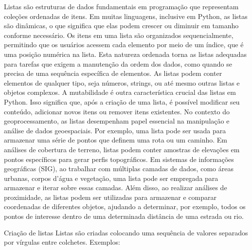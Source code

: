 \documentclass[letterpaper,10pt,english]{jupyterBook}
\begin{document}
\sphinxAtStartPar
Listas são estruturas de dados fundamentais em programação que representam coleções ordenadas de itens. Em muitas linguagens, inclusive em Python, as listas são dinâmicas, o que significa que elas podem crescer ou diminuir em tamanho conforme necessário. Os itens em uma lista são organizados sequencialmente, permitindo que os usuários acessem cada elemento por meio de um índice, que é uma posição numérica na lista. Esta natureza ordenada torna as listas adequadas para tarefas que exigem a manutenção da ordem dos dados, como quando se precisa de uma sequência específica de elementos.
As listas podem conter elementos de qualquer tipo, seja números, strings, ou até mesmo outras listas e objetos complexos. A mutabilidade é outra característica crucial das listas em Python. Isso significa que, após a criação de uma lista, é possível modificar seu conteúdo, adicionar novos itens ou remover itens existentes.
No contexto do geoprocessamento, as listas desempenham papel essencial na manipulação e análise de dados geoespaciais. Por exemplo, uma lista pode ser usada para armazenar uma série de pontos que definem uma rota ou um caminho. Em análises de cobertura de terreno, listas podem conter amostras de elevações em pontos específicos para gerar perfis topográficos. Em sistemas de informações geográficas (SIG), ao trabalhar com múltiplas camadas de dados, como áreas urbanas, corpos d’água e vegetação, uma lista pode ser empregada para armazenar e iterar sobre essas camadas. Além disso, ao realizar análises de proximidade, as listas podem ser utilizadas para armazenar e comparar coordenadas de diferentes objetos, ajudando a determinar, por exemplo, todos os pontos de interesse dentro de uma determinada distância de uma estrada ou rio.

\sphinxAtStartPar
Criação de listas
Listas são criadas colocando uma sequência de valores separados por vírgulas entre colchetes. Exemplos:
\end{document}
